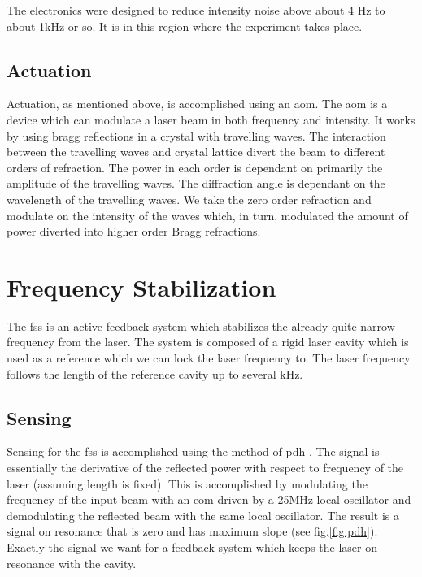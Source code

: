 The electronics were designed to reduce intensity noise above about 4 Hz to
about 1kHz or so. It is in this region where the experiment takes place.

\subsection{Actuation}

Actuation, as mentioned above, is accomplished using an \ac{aom}. The
\ac{aom} is a device which can modulate a laser beam in both frequency
and intensity. It works by using bragg reflections in a crystal with
travelling waves. The interaction between the travelling waves and crystal
lattice divert the beam to different orders of refraction. The power in each
order is dependant on primarily the amplitude of the travelling waves. The
diffraction angle is dependant on the wavelength of the travelling waves.
We take the zero order refraction and modulate on the intensity of the
waves which, in turn, modulated the amount of power diverted into higher order
Bragg refractions.

\section{Frequency Stabilization}
\label{sec:fss}

The \ac{fss} is an active feedback system which stabilizes the already quite
narrow frequency from the laser. The system is composed of a rigid laser cavity
which is used as a reference which we can lock the laser frequency to. The
laser frequency follows the length of the reference cavity up to several kHz.

\subsection{Sensing}

Sensing for the \ac{fss} is accomplished using the method of \ac{pdh}
\cite{Black:2001}.
The signal is essentially the derivative of the reflected power with respect
to frequency of the laser (assuming length is fixed).
This is accomplished by modulating the frequency of the input beam with an
\ac{eom} driven by a 25MHz local oscillator and demodulating the reflected
beam with the same local oscillator.
The result is a signal on resonance that is zero and has maximum slope
(see fig.\ref{fig:pdh}).
Exactly the signal we want for a feedback system which keeps the laser on
resonance with the cavity. 

